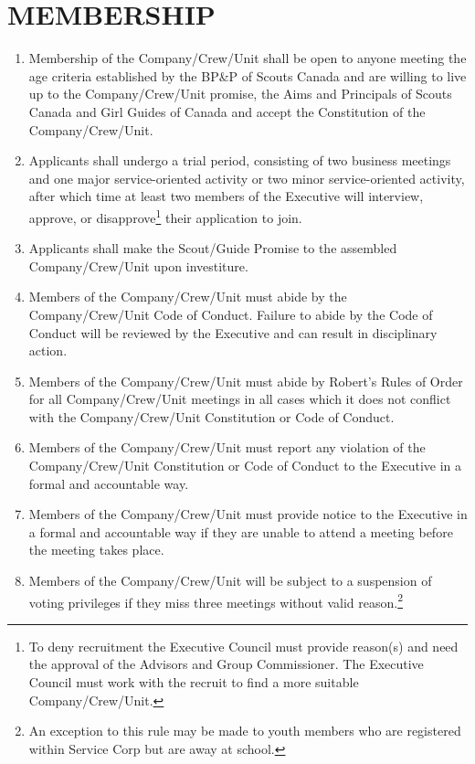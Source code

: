 \documentclass{Service_Corps_Document}
\begin{document}
    \section{MEMBERSHIP}\label{sec:membership}
    \begin{enumerate}
        \item Membership of the Company/Crew/Unit shall be open to anyone meeting the age criteria established by the BP\&P of Scouts Canada and are willing to live up to the Company/Crew/Unit promise, the Aims and Principals of Scouts Canada and Girl Guides of Canada and accept the Constitution of the Company/Crew/Unit.
        \item Applicants shall undergo a trial period, consisting of two business meetings and one major service-oriented activity or two minor service-oriented activity, after which time at least two members of the Executive will interview, approve, or disapprove\footnote{To deny recruitment the Executive Council must provide reason(s) and need the approval of the Advisors and Group Commissioner. The Executive Council must work with the recruit to find a more suitable Company/Crew/Unit.} their application to join.
        \item Applicants shall make the Scout/Guide Promise to the assembled Company/Crew/Unit upon investiture.
        \item Members of the Company/Crew/Unit must abide by the Company/Crew/Unit Code of Conduct.
        Failure to abide by the Code of Conduct will be reviewed by the Executive and can result in disciplinary action.
        \item Members of the Company/Crew/Unit must abide by Robert's Rules of Order for all Company/Crew/Unit meetings in all cases which it does not conflict with the Company/Crew/Unit Constitution or Code of Conduct.
        \item Members of the Company/Crew/Unit must report any violation of the Company/Crew/Unit Constitution or Code of Conduct to the Executive in a formal and accountable way.
        \item Members of the Company/Crew/Unit must provide notice to the Executive in a formal and accountable way if they are unable to attend a meeting before the meeting takes place.
        \item Members of the Company/Crew/Unit will be subject to a suspension of voting privileges if they miss three meetings without valid reason.\footnote{An exception to this rule may be made to youth members who are registered within Service Corp but are away at school.}

\end{enumerate}
\end{document}
